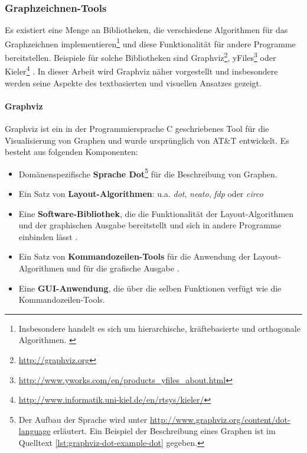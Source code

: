 \subsubsection{Graphzeichnen-Tools}
\label{subsubsec:graph-drawing-tools}

Es existiert eine Menge an Bibliotheken, die verschiedene Algorithmen für das Graphzeichnen implementieren\footnote{Insbesondere handelt es sich um hierarchische, kräftebasierte und orthogonale Algorithmen. \cite{Maier12A-Pattern-based}} und diese Funktionalität für andere Programme bereitstellen. Beispiele für solche Bibliotheken sind Graphviz\footnote{\url{http://graphviz.org}}, yFiles\footnote{\url{http://www.yworks.com/en/products_yfiles_about.html}} oder Kieler\footnote{\url{http://www.informatik.uni-kiel.de/en/rtsys/kieler/}} \cite{Maier12A-Pattern-based}. In dieser Arbeit wird Graphviz näher vorgestellt und insbesondere werden seine Aspekte des textbasierten und visuellen Ansatzes gezeigt.

\paragraph{Graphviz}

Graphviz ist ein in der Programmiersprache C geschriebenes Tool für die Visualisierung von Graphen und wurde ursprünglich von AT\&T entwickelt. Es besteht aus folgenden Komponenten:

\begin{itemize}
    \item Domänenspezifische \textbf{Sprache Dot}\footnote{Der Aufbau der Sprache wird unter \url{http://www.graphviz.org/content/dot-language} erläutert. Ein Beispiel der Beschreibung eines Graphen ist im Quelltext \ref{lst:graphviz-dot-example-dot} gegeben.} für die Beschreibung von Graphen.
    \item Ein Satz von \textbf{Layout-Algorithmen}: u.a. \textit{dot}, \textit{neato}, \textit{fdp} oder \textit{circo} \cite{Gansner14Using, NorthGansner14Dot-Manual}
    \item Eine \textbf{Software-Bibliothek}, die die Funktionalität der Layout-Algorithmen und der graphischen Ausgabe bereitstellt und sich in andere Programme einbinden lässt \cite{Gansner14Using}.
    \item Ein Satz von \textbf{Kommandozeilen-Tools} für die Anwendung der Layout-Algorithmen und für die grafische Ausgabe \cite{NorthGansner14Dot-Manual}.
    \item Eine \textbf{GUI-Anwendung}, die über die selben Funktionen verfügt wie die Kommandozeilen-Tools.
\end{itemize}

